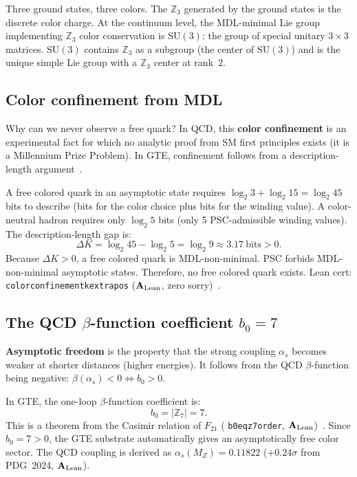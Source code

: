 \documentclass[11pt,a4paper]{article}
\newcommand{\term}[1]{\textbf{#1}}
\newcommand{\lean}[1]{%
  \penalty-100
  \begingroup\def\_{\textunderscore\allowbreak}\texttt{#1}\endgroup}
\newcommand{\CatAL}{\ensuremath{\mathbf{A}_{\rm Lean}}}
\begin{document}
Three ground states, three colors.
The $\mathbb{Z}_3$ generated by the ground states is the discrete color charge.
At the continuum level, the MDL-minimal Lie group implementing $\mathbb{Z}_3$
color conservation is $\mathrm{SU}(3)$: the group of special unitary $3 \times 3$
matrices.
$\mathrm{SU}(3)$ contains $\mathbb{Z}_3$ as a subgroup (the center of $\mathrm{SU}(3)$)
and is the unique simple Lie group with a $\mathbb{Z}_3$ center at rank~2.

\subsection{Color confinement from MDL}

Why can we never observe a free quark?
In QCD, this \term{color confinement} is an experimental fact for which
no analytic proof from SM first principles exists (it is a Millennium Prize Problem).
In GTE, confinement follows from a description-length argument~\cite{SpivackGTECompleteFramework}.

A free colored quark in an asymptotic state requires $\log_2 3 + \log_2 15 = \log_2 45$
bits to describe (bits for the color choice plus bits for the winding value).
A color-neutral hadron requires only $\log_2 5$ bits (only 5 PSC-admissible winding values).
The description-length gap is:
\[
  \Delta K = \log_2 45 - \log_2 5 = \log_2 9 \approx 3.17~\text{bits} > 0.
\]
Because $\Delta K > 0$, a free colored quark is MDL-non-minimal.
PSC forbids MDL-non-minimal asymptotic states.
Therefore, no free colored quark exists.
Lean cert: \lean{color\_confinement\_k\_extra\_pos} (\CatAL, zero sorry)~\cite{SpivackGTECompleteFramework}.

\subsection{The QCD $\beta$-function coefficient $b_0 = 7$}

\term{Asymptotic freedom} is the property that the strong coupling $\alpha_s$ becomes
weaker at shorter distances (higher energies).
It follows from the QCD $\beta$-function being negative:
$\beta(\alpha_s) < 0 \iff b_0 > 0$.

In GTE, the one-loop $\beta$-function coefficient is:
\begin{equation}
  b_0 = |\mathbb{Z}_7| = 7.
  \label{eq:b0}
\end{equation}
This is a theorem from the Casimir relation of $F_{21}$
(\lean{b0\_eq\_z7\_order}, \CatAL)~\cite{SpivackGTECompleteFramework}.
Since $b_0 = 7 > 0$, the GTE substrate automatically gives an asymptotically free
color sector.
The QCD coupling is derived as $\alpha_s(M_Z) = 0.11822$ ($+0.24\sigma$
from PDG~2024, \CatAL).
\end{document}
